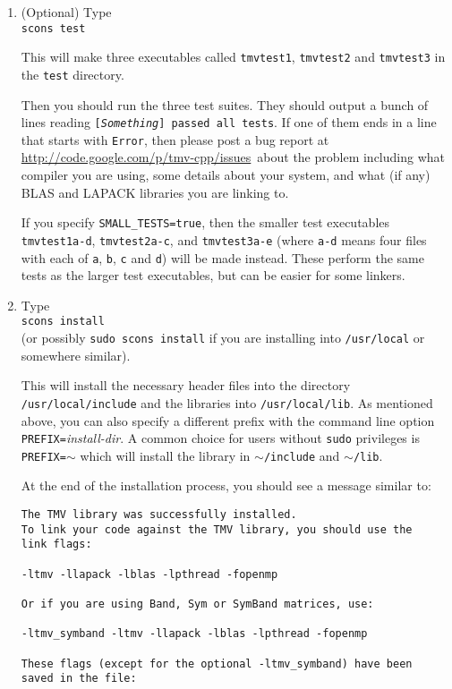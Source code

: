 \documentclass[twoside,letterpaper,11pt]{article}
\newcommand{\myissuesx}{http://code.google.com/p/tmv-cpp/issues}
\newcommand{\myissues}{\url{\myissuesx}}
\renewcommand{\tt}[1]{{\lstinline {#1}}}
\begin{document}
\begin{enumerate}
\item (Optional) Type\\
\texttt{scons test}

This will make three executables called \texttt{tmvtest1}, 
\texttt{tmvtest2} and \texttt{tmvtest3} in the \texttt{test} directory.

Then you should run the three test suites.
They should output a bunch of lines reading \texttt{[{\em Something}] passed all tests}.
If one of them ends in a line that starts with \texttt{Error}, 
then please post a bug report at \myissues\ about the problem including what compiler
you are using, some details about your system, and what (if any) BLAS and LAPACK
libraries you are linking to.

If you specify \texttt{SMALL\_TESTS=true}, then the smaller test executables
\texttt{tmvtest1a-d}, \texttt{tmvtest2a-c}, and \texttt{tmvtest3a-e} (where \tt{a-d} means 
four files with each of \tt{a}, \tt{b}, \tt{c} and \tt{d})
will be made instead.
These perform the same tests as the larger test executables, but can be easier
for some linkers.

\item Type\\
\texttt{scons install}\\
(or possibly \tt{sudo scons install} if you are installing into \tt{/usr/local} or somewhere similar).

This will install the necessary header files into the directory \texttt{/usr/local/include} and the libraries
into \texttt{/usr/local/lib}.  As mentioned above, you can also specify a different prefix 
with the command line option \texttt{PREFIX=}\emph{install-dir}.  A common choice for users
without \texttt{sudo} privileges is \texttt{PREFIX=$\sim$} which will install the library in \texttt{$\sim$/include}
and \texttt{$\sim$/lib}.

At the end of the installation process, you should see a message similar to:
\begin{verbatim}
The TMV library was successfully installed.  
To link your code against the TMV library, you should use the 
link flags: 

-ltmv -llapack -lblas -lpthread -fopenmp

Or if you are using Band, Sym or SymBand matrices, use: 

-ltmv_symband -ltmv -llapack -lblas -lpthread -fopenmp

These flags (except for the optional -ltmv_symband) have been
saved in the file:


\end{verbatim}
\end{enumerate}
\end{document}
